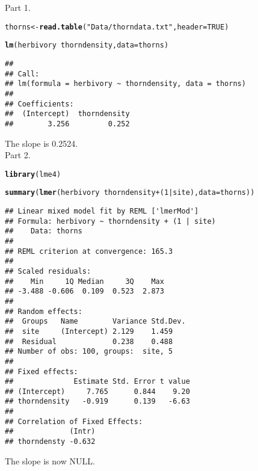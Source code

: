 \documentclass[12pt,a4paper]{scrartcl}\usepackage[]{graphicx}\usepackage[]{color}
\makeatletter
\newcommand{\hlnum}[1]{\textcolor[rgb]{0.686,0.059,0.569}{#1}}%
\newcommand{\hlstr}[1]{\textcolor[rgb]{0.192,0.494,0.8}{#1}}%
\newcommand{\hlopt}[1]{\textcolor[rgb]{0,0,0}{#1}}%
\newcommand{\hlstd}[1]{\textcolor[rgb]{0.345,0.345,0.345}{#1}}%
\newcommand{\hlkwb}[1]{\textcolor[rgb]{0.69,0.353,0.396}{#1}}%
\newcommand{\hlkwc}[1]{\textcolor[rgb]{0.333,0.667,0.333}{#1}}%
\newcommand{\hlkwd}[1]{\textcolor[rgb]{0.737,0.353,0.396}{\textbf{#1}}}%
\newenvironment{kframe}{%
 \def\at@end@of@kframe{}%
 \ifinner\ifhmode%
  \def\at@end@of@kframe{\end{minipage}}%
  \begin{minipage}{\columnwidth}%
 \fi\fi%
 \def\FrameCommand##1{\hskip\@totalleftmargin \hskip-\fboxsep
 \colorbox{shadecolor}{##1}\hskip-\fboxsep
     \hskip-\linewidth \hskip-\@totalleftmargin \hskip\columnwidth}%
 \MakeFramed {\advance\hsize-\width
   \@totalleftmargin\z@ \linewidth\hsize
   \@setminipage}}%
 {\par\unskip\endMakeFramed%
 \at@end@of@kframe}
\newenvironment{knitrout}{}{} %
\makeatother
\begin{document}
\begin{Answer}
Part 1.
\begin{knitrout}
\color{fgcolor}\begin{kframe}
\begin{alltt}
\hlstd{thorns} \hlkwb{<-} \hlkwd{read.table}\hlstd{(}\hlstr{"Data/thorndata.txt"}\hlstd{,} \hlkwc{header} \hlstd{=} \hlnum{TRUE}\hlstd{)}
\end{alltt}


{\ttfamily\noindent{}}

{\ttfamily\noindent\bfseries{}}\begin{alltt}
\hlkwd{lm}\hlstd{(herbivory} \hlopt{~} \hlstd{thorndensity,} \hlkwc{data}\hlstd{=thorns)}
\end{alltt}
\begin{verbatim}
## 
## Call:
## lm(formula = herbivory ~ thorndensity, data = thorns)
## 
## Coefficients:
##  (Intercept)  thorndensity  
##        3.256         0.252
\end{verbatim}
\end{kframe}
\end{knitrout}
The slope is 0.2524.\\

Part 2.
\begin{knitrout}
\color{fgcolor}\begin{kframe}
\begin{alltt}
\hlkwd{library}\hlstd{(lme4)}
\end{alltt}


{\ttfamily\noindent\itshape\color{messagecolor}{\#\# Loading required package: Matrix}}\begin{alltt}
\hlkwd{summary}\hlstd{(}\hlkwd{lmer}\hlstd{(herbivory} \hlopt{~} \hlstd{thorndensity} \hlopt{+} \hlstd{(}\hlnum{1}\hlopt{|}\hlstd{site),} \hlkwc{data}\hlstd{=thorns))}
\end{alltt}
\begin{verbatim}
## Linear mixed model fit by REML ['lmerMod']
## Formula: herbivory ~ thorndensity + (1 | site)
##    Data: thorns
## 
## REML criterion at convergence: 165.3
## 
## Scaled residuals: 
##    Min     1Q Median     3Q    Max 
## -3.488 -0.606  0.109  0.523  2.873 
## 
## Random effects:
##  Groups   Name        Variance Std.Dev.
##  site     (Intercept) 2.129    1.459   
##  Residual             0.238    0.488   
## Number of obs: 100, groups:  site, 5
## 
## Fixed effects:
##              Estimate Std. Error t value
## (Intercept)     7.765      0.844    9.20
## thorndensity   -0.919      0.139   -6.63
## 
## Correlation of Fixed Effects:
##             (Intr)
## thorndensty -0.632
\end{verbatim}
\end{kframe}
\end{knitrout}
The slope is now NULL.\\


\end{Answer}
\end{document}
